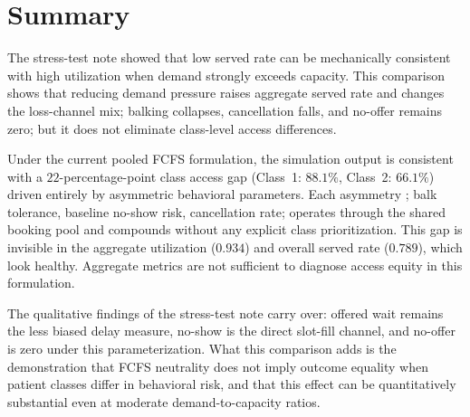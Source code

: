 \documentclass[11pt]{article}
\begin{document}
\section{Summary}

The stress-test note showed that low served rate can be mechanically
consistent with high utilization when demand strongly exceeds capacity.
This comparison shows that reducing demand pressure raises aggregate served
rate and changes the loss-channel mix; balking collapses, cancellation falls,
and no-offer remains zero; but it does not eliminate class-level access
differences.

Under the current pooled FCFS formulation, the simulation output is consistent
with a $22$-percentage-point class access gap (Class~1: $88.1\%$, Class~2:
$66.1\%$) driven entirely by asymmetric behavioral parameters. Each asymmetry
; balk tolerance, baseline no-show risk, cancellation rate; operates through
the shared booking pool and compounds without any explicit class prioritization.
This gap is invisible in the aggregate utilization ($0.934$) and overall served
rate ($0.789$), which look healthy. Aggregate metrics are not sufficient to
diagnose access equity in this formulation.

The qualitative findings of the stress-test note carry over: offered wait
remains the less biased delay measure, no-show is the direct slot-fill channel,
and no-offer is zero under this parameterization. What this comparison adds is
the demonstration that FCFS neutrality does not imply outcome equality when
patient classes differ in behavioral risk, and that this effect can be
quantitatively substantial even at moderate demand-to-capacity ratios.
\end{document}
